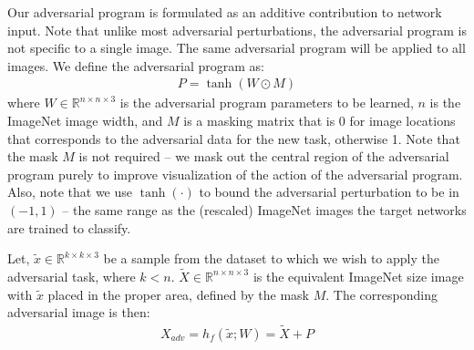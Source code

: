 \documentclass{article}
\newcommand{\jcom}[1]{{\textcolor{darkgreen}{[Jascha: #1]}}}
\begin{document}
Our adversarial program is formulated as an additive contribution to network input. 
Note that unlike most adversarial perturbations, the adversarial program is not specific to a single image. 
The same adversarial program will be applied to all images.
We define the adversarial program as:
\begin{align}
P = \tanh\left(W \odot M\right)
\end{align}
where $W \in \mathbb{R}^{n \times n \times 3}$ is the adversarial program parameters to be learned, $n$ is the ImageNet image width, and $M$ is a masking matrix that is 0 for image locations that corresponds to the adversarial data for the new task, otherwise 1. 
Note that the mask $M$ is not required -- we mask out the central region of the adversarial program purely to improve visualization of the action of the adversarial program. 
Also, note that we use $\tanh\left(\cdot\right)$ to bound the adversarial perturbation to be in $(-1, 1)$ -- the same range as the (rescaled) ImageNet images the target networks are trained to classify. 

Let, $\tilde{x} \in \mathbb{R}^{k \times k \times 3}$ be a sample from the dataset to which we wish to apply the adversarial task, where $k < n$. $\tilde{X} \in \mathbb{R}^{n \times n \times 3}$ is the equivalent ImageNet size image with $\tilde{x}$ placed in the proper area, defined by the mask $M$.
The corresponding adversarial image is then:
\begin{align}
X_{adv} = h_f\left(\tilde{x}; W\right) = 
\tilde{X} + P
\label{eqn: adv prog}
\end{align}%
\end{document}
